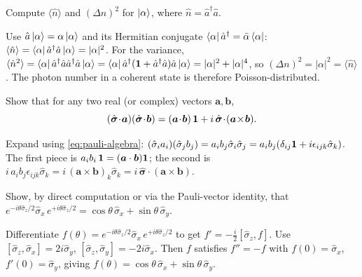 \begin{exercise}
Compute $\langle\hat n\rangle$ and $(\Delta n)^2$ for
$\ket{\alpha}$, where $\hat n=\hat a^\dagger\hat a$.
\begin{solution}
Use $\hat a\ket{\alpha}=\alpha\ket{\alpha}$ and its Hermitian
conjugate $\bra{\alpha}\hat a^\dagger=\bar\alpha\bra{\alpha}$:
$\langle\hat n\rangle=\bra{\alpha}\hat a^\dagger\hat a\ket{\alpha}
=|\alpha|^2$. For the variance,
$\langle\hat n^2\rangle=\bra{\alpha}\hat a^\dagger\hat a\hat a^\dagger\hat a\ket{\alpha}
=\bra{\alpha}\hat a^\dagger(\mathbf{1}+\hat a^\dagger\hat a)\hat a\ket{\alpha}
=|\alpha|^2+|\alpha|^4$, so
$(\Delta n)^2=|\alpha|^2=\langle\hat n\rangle$. The photon number
in a coherent state is therefore Poisson-distributed.
\end{solution}
\end{exercise}

\begin{exercise}
Show that for any two real (or complex) vectors $\bm{a},\bm{b}$,
\[
(\hat{\bm{\sigma}}\!\cdot\!\bm{a})(\hat{\bm{\sigma}}\!\cdot\!\bm{b})
=(\bm{a}\!\cdot\!\bm{b})\,\id+i\,\hat{\bm{\sigma}}\!\cdot\!(\bm{a}\!\times\!\bm{b}).
\]
\begin{solution}
Expand using \cref{eq:pauli-algebra}:
$(\hat\sigma_i a_i)(\hat\sigma_j b_j)=a_i b_j\hat\sigma_i\hat\sigma_j
=a_i b_j(\delta_{ij}\mathbf{1}+i\epsilon_{ijk}\hat\sigma_k)$.
The first piece is $a_i b_i\,\mathbf{1}=(\bm a\cdot\bm b)\mathbf{1}$; the second
is $i\,a_i b_j\epsilon_{ijk}\hat\sigma_k=i\,(\bm a\times\bm b)_k\hat\sigma_k
=i\,\hat{\bm\sigma}\cdot(\bm a\times\bm b)$.
\end{solution}
\end{exercise}

\begin{exercise}
Show, by direct computation or via the Pauli-vector identity, that
$e^{-i\theta\hat\sigma_z/2}\hat\sigma_x\,e^{+i\theta\hat\sigma_z/2}
=\cos\theta\,\hat\sigma_x+\sin\theta\,\hat\sigma_y$.
\begin{solution}
Differentiate
$f(\theta)=e^{-i\theta\hat\sigma_z/2}\hat\sigma_x\,e^{+i\theta\hat\sigma_z/2}$
to get $f'=-\tfrac{i}{2}[\hat\sigma_z,f]$. Use
$[\hat\sigma_z,\hat\sigma_x]=2i\hat\sigma_y$,
$[\hat\sigma_z,\hat\sigma_y]=-2i\hat\sigma_x$. Then $f$ satisfies
$f''=-f$ with $f(0)=\hat\sigma_x$, $f'(0)=\hat\sigma_y$, giving
$f(\theta)=\cos\theta\,\hat\sigma_x+\sin\theta\,\hat\sigma_y$.
\end{solution}
\end{exercise}

